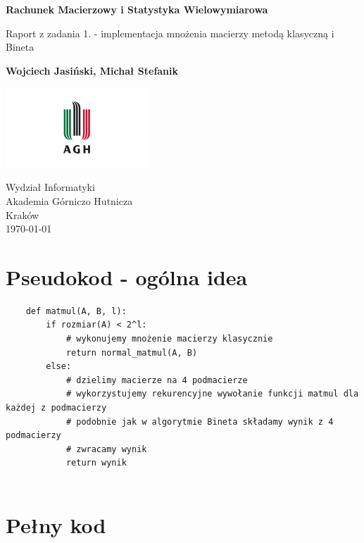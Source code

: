 \documentclass[a4paper]{article}
\begin{document}
\begin{titlepage}
    \begin{center}
        \vspace*{1cm}

        \Huge
        \textbf{Rachunek Macierzowy i Statystyka Wielowymiarowa}

        \Large
        \vspace{0.5cm}
        Raport z zadania 1. - implementacja mnożenia macierzy metodą klasyczną i Bineta

        \vspace{1.5cm}

        \textbf{Wojciech Jasiński, Michał Stefanik}

        \vfill
        \vspace{0.8cm}

        \includegraphics[width=0.4\textwidth]{agh_logo.jpg}

        Wydział Informatyki\\
        Akademia Górniczo Hutnicza\\
        Kraków\\
        \today

    \end{center}
\end{titlepage}


\section{Pseudokod - ogólna idea}

\begin{verbatim}
    def matmul(A, B, l):
        if rozmiar(A) < 2^l:
            # wykonujemy mnożenie macierzy klasycznie
            return normal_matmul(A, B)
        else:
            # dzielimy macierze na 4 podmacierze
            # wykorzystujemy rekurencyjne wywołanie funkcji matmul dla każdej z podmacierzy
            # podobnie jak w algorytmie Bineta składamy wynik z 4 podmacierzy
            # zwracamy wynik
            return wynik


\end{verbatim}

\section{Pełny kod}
\end{document}
